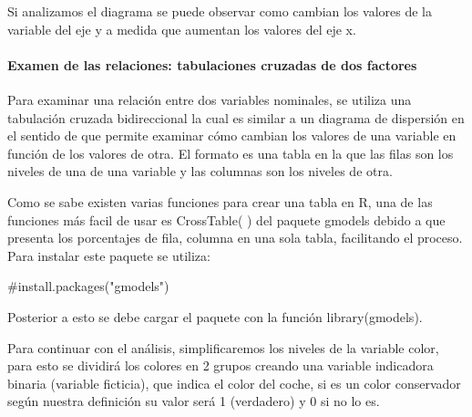 \documentclass[
  letterpaper,
  DIV=11,
  numbers=noendperiod]{scrartcl}
\let\oldparagraph\paragraph
\renewcommand{\paragraph}[1]{\oldparagraph{#1}\mbox{}}
\newenvironment{Shaded}{\begin{snugshade}}{\end{snugshade}}
\newcommand{\CommentTok}[1]{\textcolor[rgb]{0.37,0.37,0.37}{#1}}
\newcommand{\FunctionTok}[1]{\textcolor[rgb]{0.28,0.35,0.67}{#1}}
\newcommand{\NormalTok}[1]{\textcolor[rgb]{0.00,0.23,0.31}{#1}}
\newcommand{\OtherTok}[1]{\textcolor[rgb]{0.00,0.23,0.31}{#1}}
\newcommand{\SpecialCharTok}[1]{\textcolor[rgb]{0.37,0.37,0.37}{#1}}
\newcommand{\StringTok}[1]{\textcolor[rgb]{0.13,0.47,0.30}{#1}}
\begin{document}
Si analizamos el diagrama se puede observar como cambian los valores de
la variable del eje y a medida que aumentan los valores del eje x.

\hypertarget{examen-de-las-relaciones-tabulaciones-cruzadas-de-dos-factores}{%
\paragraph{Examen de las relaciones: tabulaciones cruzadas de dos
factores}\label{examen-de-las-relaciones-tabulaciones-cruzadas-de-dos-factores}}

Para examinar una relación entre dos variables nominales, se utiliza una
tabulación cruzada bidireccional la cual es similar a un diagrama de
dispersión en el sentido de que permite examinar cómo cambian los
valores de una variable en función de los valores de otra. El formato es
una tabla en la que las filas son los niveles de una de una variable y
las columnas son los niveles de otra.

Como se sabe existen varias funciones para crear una tabla en R, una de
las funciones más facil de usar es CrossTable( ) del paquete gmodels
debido a que presenta los porcentajes de fila, columna en una sola
tabla, facilitando el proceso. Para instalar este paquete se utiliza:

\begin{Shaded}
\begin{Highlighting}[]
\CommentTok{\#install.packages("gmodels")}
\end{Highlighting}
\end{Shaded}

Posterior a esto se debe cargar el paquete con la función
library(gmodels).

Para continuar con el análisis, simplificaremos los niveles de la
variable color, para esto se dividirá los colores en 2 grupos creando
una variable indicadora binaria (variable ficticia), que indica el color
del coche, si es un color conservador según nuestra definición su valor
será 1 (verdadero) y 0 si no lo es.

\begin{Shaded}
\end{Shaded}
\end{document}
